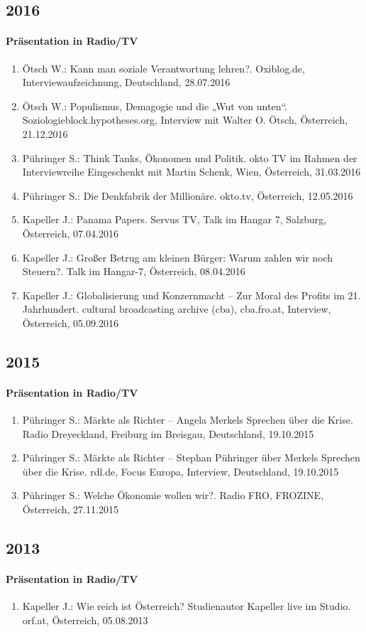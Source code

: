 \subsection*{2016}
\paragraph{Präsentation in Radio/TV}
\begin{enumerate}
	\item Ötsch W.: Kann man soziale Verantwortung lehren?. Oxiblog.de, Interviewaufzeichnung, Deutschland, 28.07.2016
	\item Ötsch W.: Populismus, Demagogie und die „Wut von unten“. Soziologieblock.hypotheses.org, Interview mit Walter O. Ötsch, Österreich, 21.12.2016
	\item Pühringer S.: Think Tanks, Ökonomen und Politik. okto TV im Rahmen der Interviewreihe \glqq Eingeschenkt\grqq{} mit Martin Schenk, Wien, Österreich, 31.03.2016
	\item Pühringer S.: Die Denkfabrik der Millionäre. okto.tv, Österreich, 12.05.2016
	\item Kapeller J.: Panama Papers. Servus TV, \glqq Talk im Hangar 7\grqq{}, Salzburg, Österreich, 07.04.2016
	\item Kapeller J.: Großer Betrug am kleinen Bürger: Warum zahlen wir noch Steuern?. Talk im Hangar-7, Österreich, 08.04.2016
	\item Kapeller J.: Globalisierung und Konzernmacht – Zur Moral des Profits im 21. Jahrhundert. cultural broadcasting archive (cba), cba.fro.at, Interview, Österreich, 05.09.2016
\end{enumerate}
\subsection*{2015}
\paragraph{Präsentation in Radio/TV}
\begin{enumerate}
	\item Pühringer S.: Märkte als Richter – Angela Merkels Sprechen über die Krise. Radio Dreyeckland, Freiburg im Breisgau, Deutschland, 19.10.2015
	\item Pühringer S.: \glqq Märkte als Richter\grqq{} -- Stephan Pühringer über Merkels Sprechen über die Krise. rdl.de, Focus Europa, Interview, Deutschland, 19.10.2015
	\item Pühringer S.: Welche Ökonomie wollen wir?. Radio FRO, FROZINE, Österreich, 27.11.2015
\end{enumerate}
\subsection*{2013}
\paragraph{Präsentation in Radio/TV}
\begin{enumerate}
	\item Kapeller J.: Wie reich ist Österreich? Studienautor Kapeller live im Studio. orf.at, Österreich, 05.08.2013
\end{enumerate}

